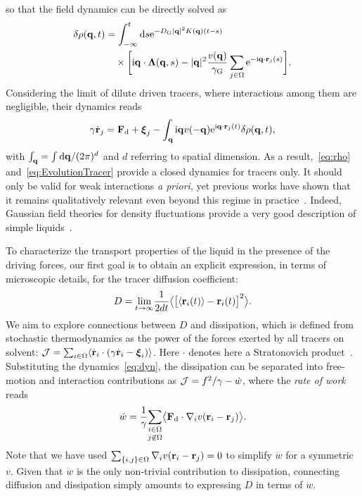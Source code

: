 \documentclass[pre, superscriptaddress, twocolumn,pre]{revtex4-1}
\newcommand{\dd}{\text{d}}
\newcommand{\ee}{\text{e}}
\newcommand{\ii}{\text{i}}
\begin{document}
so that the field dynamics can be directly solved as
\begin{equation}\label{eq:rho}
	\begin{aligned}
		\delta\rho({\bf q},t) &= \int_{-\infty}^t \dd s \ee^{-D_{\rm G} |{\bf q}|^2 K({\bf q})(t-s)}
		\\
		&\quad\times \bigg[ \ii{\bf q} \cdot {\boldsymbol\Lambda}({\bf q},s) - |{\bf q}|^2 \frac{v({\bf q})}{\gamma_{\rm G}} \sum_{j\in\Omega}\ee^{-\ii {\bf q}\cdot {\bf r}_j(s)}\bigg] .
	\end{aligned}
\end{equation}
Considering the limit of dilute driven tracers, where interactions among them are negligible, their dynamics reads
\begin{equation}\label{eq:EvolutionTracer}
	\gamma\dot{\bf r}_j = {\bf F}_\text{d} + {\boldsymbol\xi_j} - \int_{\bf q} \ii{\bf q} v(-{\bf q})\ee^{\ii{\bf q} \cdot {\bf r}_j(t)} \delta \rho({\bf q}, t) ,
\end{equation}
with $\int_{\bf q}=\int\dd{\bf q}/(2\pi)^d$ and $d$ referring to spatial dimension. As a result,~\eqref{eq:rho} and~\eqref{eq:EvolutionTracer} provide a  closed dynamics for tracers only. It should only be valid for weak interactions {\it a priori}, yet previous works have shown that it remains qualitatively relevant even beyond this regime in practice~\cite{Demery2015, Martin2018}. Indeed, Gaussian field theories for density fluctuations provide a very good description of simple liquids~\cite{Chandler1993}.


To characterize the transport properties of the liquid in the presence of the driving forces, our first goal is to obtain an explicit expression, in terms of microscopic details, for the tracer diffusion coefficient:
\begin{equation}
	D = \underset{t\to\infty}{\lim} \frac{1}{2dt} \big\langle \big[\langle{\bf r}_i(t)\rangle-{\bf r}_i(t)\big]^2 \big\rangle .
\end{equation}
We aim to explore connections between $D$ and dissipation, which is defined from stochastic thermodynamics as the power of the forces exerted by all tracers on solvent: ${\cal J} = \sum_{i\in\Omega}\langle\dot{\bf r}_i\cdot(\gamma\dot{\bf r}_i-{\boldsymbol\xi}_i)\rangle$. Here $\cdot$ denotes here a Stratonovich product~\cite{Sekimoto1998, Seifert2012}. Substituting the dynamics~\eqref{eq:dyn}, the dissipation can be separated into free-motion and interaction contributions as ${\cal J} = f^2/\gamma - \dot w$, where the {\it rate of work} reads
\begin{equation}\label{eq:work}
	\dot w = \frac{1}{\gamma} \underset{j\not\in\Omega}{\sum_{i\in\Omega}}\big\langle {\bf F}_{\rm d}\cdot\nabla_iv({\bf r}_i-{\bf r}_j)\big\rangle.
\end{equation}
Note that we have used $\sum_{\{i,j\}\in\Omega}\nabla_iv({\bf r}_i-{\bf r}_j)=0$ to simplify $\dot w$ for a symmetric $v$. Given that $\dot w$ is the only non-trivial contribution to dissipation, connecting diffusion and dissipation simply amounts to expressing $D$ in terms of $\dot w$.
\end{document}
